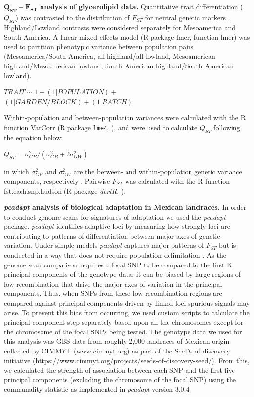 \documentclass[9pt,twocolumn,twoside,lineno]{biorxiv}
\begin{document}
\textbf{$\mathbf{Q_{ST}-F_{ST}}$ analysis of glycerolipid data.}
Quantitative trait differentiation ($Q_{ST}$) was contrasted to the distribution of $F_{ST}$ for neutral genetic markers \cite{whitlock2008evolutionary}.
Highland/Lowland contrasts were considered separately for Mesoamerica and South America.
A linear mixed effects model (R package lmer, function lmer) was used to partition phenotypic variance between population pairs (Mesoamerica/South America, all highland/all lowland, Mesoamerican highland/Mesoamerican lowland, South American highland/South American lowland).
\begin{center}
${ TRAIT \sim 1 + (1|POPULATION) + }$\\
${(1|GARDEN/BLOCK) + (1|BATCH)}$
\end{center}
Within-population and between-population variances were calculated with the R function VarCorr (R package \texttt{lme4}, \citealp{bates2014lme4}), and were used to calculate $Q_{ST}$ following the equation below:
\begin{center}
$Q_{ST}$ = \(\sigma^{2}_{GB}/(\sigma^{2}_{GB}+2\sigma^{2}_{GW})\)
\end{center}
\noindent in which $\sigma^{2}_{GB}$ and $\sigma^{2}_{GW}$ are the between- and within-population genetic variance components, respectively \cite{Leinonen2013-ic}.
Pairwise $F_{ST}$ was calculated with the R function fst.each.snp.hudson (R package \textit{dartR}, \citealp{gruber2018dartr}).

\textbf{\textit{pcadapt} analysis of biological adaptation in Mexican landraces.}
In order to conduct genome scans for signatures of adaptation we used the \textit{pcadapt} \cite{Luu2017-ws} package.
\textit{pcadapt} identifies adaptive loci by measuring how strongly loci are contributing to patterns of differentiation between major axes of genetic variation.
Under simple models \textit{pcadapt} captures major patterns of $F_{ST}$  but is conducted in a way that does not require population delimitation \cite{duforet2014genome}.
As the genome scan comparison requires a focal SNP to be compared to the first K principal components of the genotype data, it can be biased by large regions of low recombination that drive the major axes of variation in the principal components.
Thus, when SNPs from these low recombination regions are compared against principal components driven by linked loci spurious signals may arise.
To prevent this bias from occurring, we used custom scripts to calculate the principal component step separately based upon all the chromosomes except for the chromosome of the focal SNPs being tested.
The genotype data we used for this analysis was GBS data from roughly 2,000 landraces of Mexican origin collected by CIMMYT (www.cimmyt.org) as part of the SeeDs of discovery initiative (https://www.cimmyt.org/projects/seeds-of-discovery-seed/).
From this, we calculated the strength of association between each SNP and the first five principal components (excluding the chromosome of the focal SNP) using the communality statistic as implemented in \textit{pcadapt} version 3.0.4.
\end{document}
